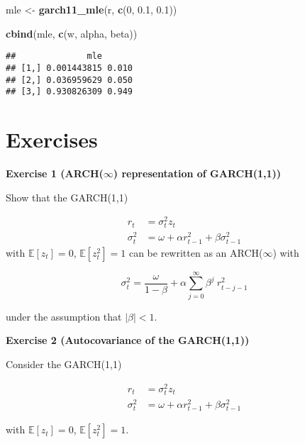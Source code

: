 \documentclass[
]{book}
\newenvironment{Shaded}{\begin{snugshade}}{\end{snugshade}}
\newcommand{\DecValTok}[1]{\textcolor[rgb]{0.00,0.00,0.81}{#1}}
\newcommand{\FloatTok}[1]{\textcolor[rgb]{0.00,0.00,0.81}{#1}}
\newcommand{\FunctionTok}[1]{\textcolor[rgb]{0.13,0.29,0.53}{\textbf{#1}}}
\newcommand{\NormalTok}[1]{#1}
\newcommand{\OtherTok}[1]{\textcolor[rgb]{0.56,0.35,0.01}{#1}}
\begin{document}
\begin{Shaded}
\begin{Highlighting}[]
\NormalTok{mle }\OtherTok{\textless{}{-}} \FunctionTok{garch11\_mle}\NormalTok{(r, }\FunctionTok{c}\NormalTok{(}\DecValTok{0}\NormalTok{, }\FloatTok{0.1}\NormalTok{, }\FloatTok{0.1}\NormalTok{))}
\end{Highlighting}
\end{Shaded}

\begin{Shaded}
\begin{Highlighting}[]
\FunctionTok{cbind}\NormalTok{(mle, }\FunctionTok{c}\NormalTok{(w, alpha, beta))}
\end{Highlighting}
\end{Shaded}

\begin{verbatim}
##              mle      
## [1,] 0.001443815 0.010
## [2,] 0.036959629 0.050
## [3,] 0.930826309 0.949
\end{verbatim}

\hypertarget{exercises-2}{%
\section{Exercises}\label{exercises-2}}

\textbf{Exercise 1 (ARCH(\(\infty\)) representation of GARCH(1,1))}

Show that the GARCH(1,1)

\[
\begin{aligned}
r_t &= \sigma^2_t z_t \\[1ex]
\sigma^2_t &= \omega + \alpha r_{t-1}^2 + \beta \sigma^2_{t-1}
\end{aligned}
\]
with \(\mathbb{E}[z_t] = 0\), \(\mathbb{E}[z^2_t] = 1\) can be rewritten as an ARCH(\(\infty\)) with

\[
\sigma^2_t = \frac{\omega}{1-\beta} + \alpha \sum_{j=0}^\infty \beta^j \ r^2_{t-j-1}
\]

under the assumption that \(|\beta| < 1\).

\textbf{Exercise 2 (Autocovariance of the GARCH(1,1))}

Consider the GARCH(1,1)

\[
\begin{aligned}
r_t &= \sigma^2_t z_t \\[1ex]
\sigma^2_t &= \omega + \alpha r_{t-1}^2 + \beta \sigma^2_{t-1}
\end{aligned}
\]

with \(\mathbb{E}[z_t] = 0\), \(\mathbb{E}[z^2_t] = 1\).
\end{document}
